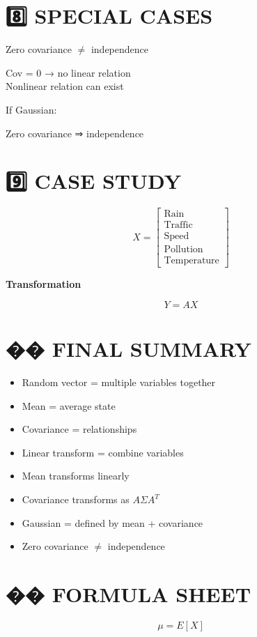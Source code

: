 \documentclass[12pt]{article}
\begin{document}
\section*{8️⃣ SPECIAL CASES}

Zero covariance $\neq$ independence

Cov = 0 → no linear relation \\
Nonlinear relation can exist

If Gaussian:

Zero covariance ⇒ independence

\section*{9️⃣ CASE STUDY}

\[
X =
\begin{bmatrix}
\text{Rain} \\
\text{Traffic} \\
\text{Speed} \\
\text{Pollution} \\
\text{Temperature}
\end{bmatrix}
\]

\textbf{Transformation}

\[
Y = AX
\]

\section*{�� FINAL SUMMARY}

\begin{itemize}
\item Random vector = multiple variables together
\item Mean = average state
\item Covariance = relationships
\item Linear transform = combine variables
\item Mean transforms linearly
\item Covariance transforms as $A \Sigma A^T$
\item Gaussian = defined by mean + covariance
\item Zero covariance $\neq$ independence
\end{itemize}

\section*{�� FORMULA SHEET}

\[
\mu = E[X]
\]
\end{document}
